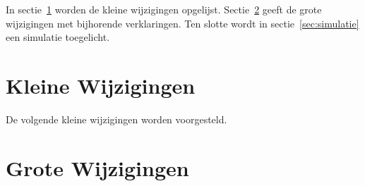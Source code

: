 \documentclass[a4paper]{article}
\begin{document}
        In sectie~\ref{sec:kleine_wijzigingen} worden de kleine wijzigingen opgelijst. Sectie~\ref{sec:grote_wijzigingen} geeft de grote wijzigingen met bijhorende verklaringen. Ten slotte wordt in sectie~\ref{sec:simulatie} een simulatie toegelicht.

    \newpage
    \section{Kleine Wijzigingen}
    \label{sec:kleine_wijzigingen}

    \begin{multicols*}{2}
        De volgende kleine wijzigingen worden voorgesteld.
    \end{multicols*}

    \restoregeometry

    \newpage
    \section{Grote Wijzigingen}
    \label{sec:grote_wijzigingen}
\end{document}
